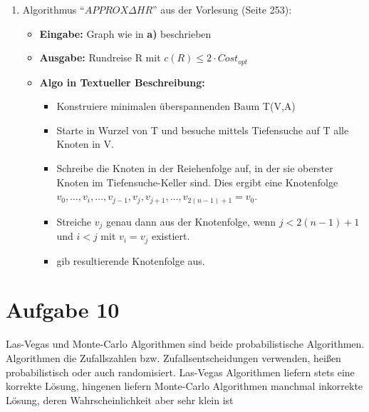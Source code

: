 \documentclass[10pt,a4paper]{article}
\begin{document}
\begin{enumerate}[label={\alph*)}]
        \item Algorithmus ``$APPROX \Delta HR$'' aus der Vorlesung (Seite 253):
            \begin{itemize}
                \item \textbf{Eingabe:} Graph wie in \textbf{a)} beschrieben
                \item \textbf{Ausgabe:} Rundreise R mit $c(R) \leq 2 \cdot Cost_{opt}$
                \item \textbf{Algo in Textueller Beschreibung:} \\
                    \begin{itemize}
                        \item Konstruiere minimalen überspannenden Baum T(V,A)
                        \item Starte in Wurzel von T und besuche mittels Tiefensuche
                            auf T alle Knoten in V.
                        \item Schreibe die Knoten in der Reiehenfolge auf, in der
                            sie oberster Knoten im Tiefensuche-Keller sind. Dies
                            ergibt eine Knotenfolge $v_0,\ldots,v_i,\ldots,
                            v_{j-1},v_j,v_{j+1},\ldots,v_{2(n-1)+1} = v_0$.
                        \item Streiche $v_j$ genau dann aus der Knotenfolge, wenn
                        $ j < 2(n-1) + 1 $ und $ i < j $ mit $ v_i = v_j$ existiert.
                        \item gib resultierende Knotenfolge aus.
                    \end{itemize}

            \end{itemize}




    \end{enumerate}


\section*{Aufgabe 10}
    Las-Vegas und Monte-Carlo Algorithmen sind beide
    probabilistische Algorithmen. Algorithmen die Zufallszahlen
    bzw. Zufallsentscheidungen verwenden, heißen probabilistisch
    oder auch randomisiert. Las-Vegas Algorithmen liefern stets
    eine korrekte Lösung, hingenen liefern Monte-Carlo Algorithmen
    manchmal inkorrekte Lösung, deren Wahrscheinlichkeit aber sehr klein ist
\end{document}
